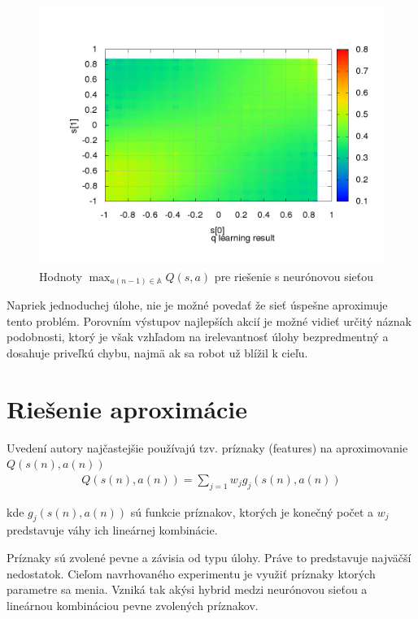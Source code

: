 \begin{figure}[!htb]
\centering
\includegraphics[scale=.4]{../../results_q_learning/experiment_divergence/testing_neuron/q_map.png}
\caption{Hodnoty $\max_{a(n-1) \in \mathbb{A}} Q(s, a)$ pre riešenie s neurónovou sieťou}
\label{img:divergence_table_q_map}
\end{figure}

Napriek jednoduchej úlohe, nie je možné povedať že sieť úspešne aproximuje tento problém.
Porovním výstupov najlepších akcií je možné vidieť určitý náznak podobnosti, ktorý je
však vzhľadom na irelevantnosť úlohy bezpredmentný a dosahuje priveľkú chybu, najmä
ak sa robot už blížil k cieľu.

\section {Riešenie aproximácie}

Uvedení autory najčastejšie používajú tzv. príznaky (features) na aproximovanie $Q(s(n), a(n))$
\begin{align}
Q(s(n), a(n)) = \sum\limits_{j=1} w_j g_j(s(n), a(n))
\label{eq:features_func}
\end{align}

kde $g_j(s(n), a(n))$ sú funkcie príznakov, ktorých je konečný počet a
$w_j$ predstavuje váhy ich lineárnej kombinácie.

Príznaky sú zvolené pevne a závisia od typu úlohy. Práve to predstavuje najväčší
nedostatok. Cieľom navrhovaného experimentu je využiť príznaky ktorých parametre
sa menia. Vzniká tak akýsi hybrid medzi neurónovou sieťou a lineárnou kombináciou
pevne zvolených príznakov.

